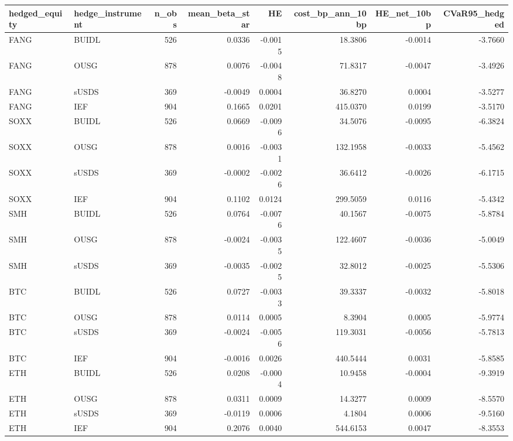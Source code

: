 \begin{tabular}{llrrrrrr}
\toprule
hedged\_equity & hedge\_instrument & n\_obs & mean\_beta\_star & HE & cost\_bp\_ann\_10bp & HE\_net\_10bp & CVaR95\_hedged \\
\midrule
FANG & BUIDL & 526 & 0.0336 & -0.0015 & 18.3806 & -0.0014 & -3.7660 \\
FANG & OUSG & 878 & 0.0076 & -0.0048 & 71.8317 & -0.0047 & -3.4926 \\
FANG & sUSDS & 369 & -0.0049 & 0.0004 & 36.8270 & 0.0004 & -3.5277 \\
FANG & IEF & 904 & 0.1665 & 0.0201 & 415.0370 & 0.0199 & -3.5170 \\
SOXX & BUIDL & 526 & 0.0669 & -0.0096 & 34.5076 & -0.0095 & -6.3824 \\
SOXX & OUSG & 878 & 0.0016 & -0.0031 & 132.1958 & -0.0033 & -5.4562 \\
SOXX & sUSDS & 369 & -0.0002 & -0.0026 & 36.6412 & -0.0026 & -6.1715 \\
SOXX & IEF & 904 & 0.1102 & 0.0124 & 299.5059 & 0.0116 & -5.4342 \\
SMH & BUIDL & 526 & 0.0764 & -0.0076 & 40.1567 & -0.0075 & -5.8784 \\
SMH & OUSG & 878 & -0.0024 & -0.0035 & 122.4607 & -0.0036 & -5.0049 \\
SMH & sUSDS & 369 & -0.0035 & -0.0025 & 32.8012 & -0.0025 & -5.5306 \\
BTC & BUIDL & 526 & 0.0727 & -0.0033 & 39.3337 & -0.0032 & -5.8018 \\
BTC & OUSG & 878 & 0.0114 & 0.0005 & 8.3904 & 0.0005 & -5.9774 \\
BTC & sUSDS & 369 & -0.0024 & -0.0056 & 119.3031 & -0.0056 & -5.7813 \\
BTC & IEF & 904 & -0.0016 & 0.0026 & 440.5444 & 0.0031 & -5.8585 \\
ETH & BUIDL & 526 & 0.0208 & -0.0004 & 10.9458 & -0.0004 & -9.3919 \\
ETH & OUSG & 878 & 0.0311 & 0.0009 & 14.3277 & 0.0009 & -8.5570 \\
ETH & sUSDS & 369 & -0.0119 & 0.0006 & 4.1804 & 0.0006 & -9.5160 \\
ETH & IEF & 904 & 0.2076 & 0.0040 & 544.6153 & 0.0047 & -8.3553 \\
\bottomrule
\end{tabular}
